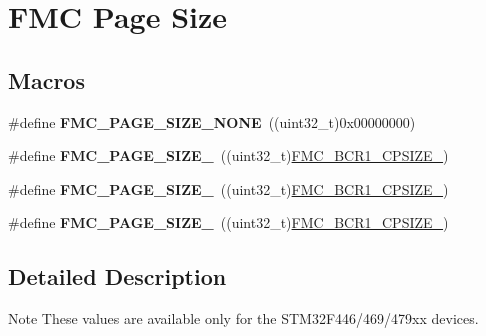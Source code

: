 \hypertarget{group___f_m_c___page___size}{}\section{F\+MC Page Size}
\label{group___f_m_c___page___size}
\subsection*{Macros}
\begin{DoxyCompactItemize}
\item 
\#define {\bfseries F\+M\+C\+\_\+\+P\+A\+G\+E\+\_\+\+S\+I\+Z\+E\+\_\+\+N\+O\+NE}~((uint32\+\_\+t)0x00000000)\hypertarget{group___f_m_c___page___size_gaa310b7443b738052ae4b44515d0127cf}{}\label{group___f_m_c___page___size_gaa310b7443b738052ae4b44515d0127cf}

\item 
\#define {\bfseries F\+M\+C\+\_\+\+P\+A\+G\+E\+\_\+\+S\+I\+Z\+E\+\_}~((uint32\+\_\+t)\hyperlink{group___peripheral___registers___bits___definition_gaa921858a5afbd90ac9aaa3f95b2c4159}{F\+M\+C\+\_\+\+B\+C\+R1\+\_\+\+C\+P\+S\+I\+Z\+E\+\_})\hypertarget{group___f_m_c___page___size_ga011ea57ad1e735287a8f39f0c05f5ccf}{}\label{group___f_m_c___page___size_ga011ea57ad1e735287a8f39f0c05f5ccf}

\item 
\#define {\bfseries F\+M\+C\+\_\+\+P\+A\+G\+E\+\_\+\+S\+I\+Z\+E\+\_}~((uint32\+\_\+t)\hyperlink{group___peripheral___registers___bits___definition_ga8bdb91c832146adf7b3c7acc8abecab6}{F\+M\+C\+\_\+\+B\+C\+R1\+\_\+\+C\+P\+S\+I\+Z\+E\+\_})\hypertarget{group___f_m_c___page___size_ga8544fe7cee2b7e53c6f29f2d2812e9cb}{}\label{group___f_m_c___page___size_ga8544fe7cee2b7e53c6f29f2d2812e9cb}

\item 
\#define {\bfseries F\+M\+C\+\_\+\+P\+A\+G\+E\+\_\+\+S\+I\+Z\+E\+\_}~((uint32\+\_\+t)\hyperlink{group___peripheral___registers___bits___definition_gad4ea9a1656dcb26a06522f183763a55c}{F\+M\+C\+\_\+\+B\+C\+R1\+\_\+\+C\+P\+S\+I\+Z\+E\+\_})\hypertarget{group___f_m_c___page___size_gae360b96ac0493b3a8f4a29187a7f3848}{}\label{group___f_m_c___page___size_gae360b96ac0493b3a8f4a29187a7f3848}

\end{DoxyCompactItemize}


\subsection{Detailed Description}
\begin{DoxyNote}{Note}
These values are available only for the S\+T\+M32\+F446/469/479xx devices. 
\end{DoxyNote}

